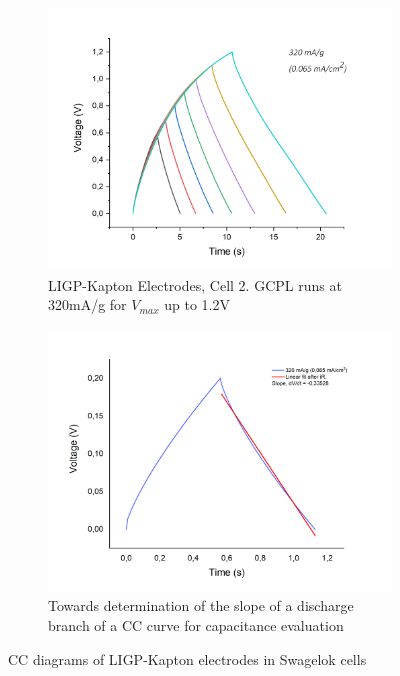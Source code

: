\begin{figure}[H]
\begin{subfigure}{0.49\textwidth}
\includegraphics[width=1\textwidth]{Figures/Results/Electrochemistry/LIGP-PI-NaNO3-Swagelok/Cell2/GCPL_Vmax12_cell2_const-current.jpg} 
\captionsetup{width=0.9\linewidth}
\caption{LIGP-Kapton Electrodes, Cell 2. GCPL runs at 320\:mA/g for $V_{max}$ up to 1.2\:V}
\label{fig:LIG-PI-cell2-CC-12}
\end{subfigure}
\begin{subfigure}{0.49\textwidth}
\includegraphics[width=1\textwidth]{Figures/Results/Electrochemistry/LIGP-PI-NaNO3-Swagelok/Cell1/GCPL_Vmax02_cell1_320mA-g-fit.jpg}
\captionsetup{width=0.9\linewidth}
\caption{Towards determination of the slope of a discharge branch of a CC curve for capacitance evaluation}
\label{fig:cc-slope-determination}
\end{subfigure}
\medskip
\caption{CC diagrams of LIGP-Kapton electrodes in Swagelok cells}
\label{fig:LIGP-PI-CC-12}
\end{figure}

